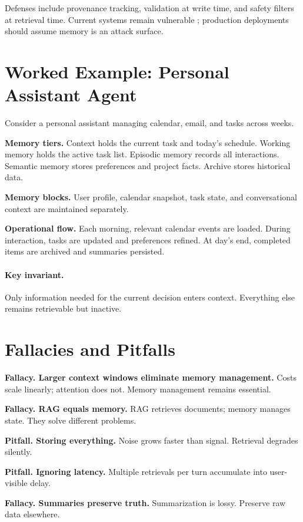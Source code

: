 Defenses include provenance tracking, validation at write time, and safety filters at retrieval time. Current systems remain vulnerable \cite{memoryprivacy2025}; production deployments should assume memory is an attack surface.

\section{Worked Example: Personal Assistant Agent}

Consider a personal assistant managing calendar, email, and tasks across weeks.

\textbf{Memory tiers.}
Context holds the current task and today’s schedule. Working memory holds the active task list. Episodic memory records all interactions. Semantic memory stores preferences and project facts. Archive stores historical data.

\textbf{Memory blocks.}
User profile, calendar snapshot, task state, and conversational context are maintained separately.

\textbf{Operational flow.}
Each morning, relevant calendar events are loaded. During interaction, tasks are updated and preferences refined. At day’s end, completed items are archived and summaries persisted.

\paragraph{Key invariant.}
Only information needed for the current decision enters context. Everything else remains retrievable but inactive.

\section{Fallacies and Pitfalls}

\textbf{Fallacy. Larger context windows eliminate memory management.}
Costs scale linearly; attention does not. Memory management remains essential.

\textbf{Fallacy. RAG equals memory.}
RAG retrieves documents; memory manages state. They solve different problems.

\textbf{Pitfall. Storing everything.}
Noise grows faster than signal. Retrieval degrades silently.

\textbf{Pitfall. Ignoring latency.}
Multiple retrievals per turn accumulate into user-visible delay.

\textbf{Fallacy. Summaries preserve truth.}
Summarization is lossy. Preserve raw data elsewhere.

